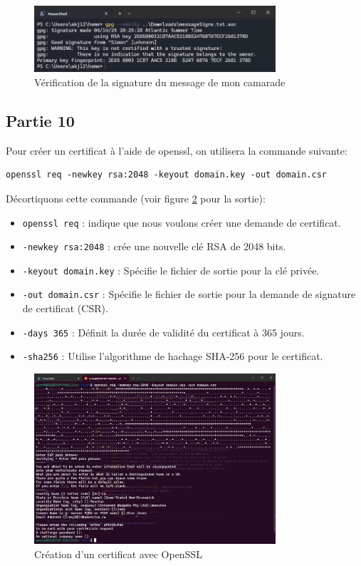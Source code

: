 \documentclass[12pt,a4paper]{article}
\begin{document}
\begin{enumerate}[label=\Roman*]
          \begin{figure}[ht]
              \centering
              \includegraphics[width=0.8\textwidth]{../img/verifSimon.png}
              \caption{Vérification de la signature du message de mon camarade}
              \label{verifSimon}
          \end{figure}
\end{enumerate}

\subsection{Partie 10}
Pour créer un certificat à l'aide de openssl, on utilisera la commande suivante:
\begin{Verbatim}[fontsize=\footnotesize]
    openssl req -newkey rsa:2048 -keyout domain.key -out domain.csr
\end{Verbatim}

Décortiquons cette commande (voir figure \ref{opensslCert} pour la sortie):
\begin{itemize}
    \item \texttt{openssl req} : indique que nous voulons créer une demande de certificat.
    \item \texttt{-newkey rsa:2048} : crée une nouvelle clé RSA de 2048 bits.
    \item \texttt{-keyout domain.key} : Spécifie le fichier de sortie pour la clé privée.
    \item \texttt{-out domain.csr} : Spécifie le fichier de sortie pour la demande de signature de certificat (CSR).
    \item \texttt{-days 365} : Définit la durée de validité du certificat à 365 jours.
    \item \texttt{-sha256} : Utilise l'algorithme de hachage SHA-256 pour le certificat.
\end{itemize}

\begin{figure}[ht]
    \centering
    \includegraphics[width=0.8\textwidth]{../img/opensslCert.png}
    \caption{Création d'un certificat avec OpenSSL}
    \label{opensslCert}
\end{figure}
\end{document}
